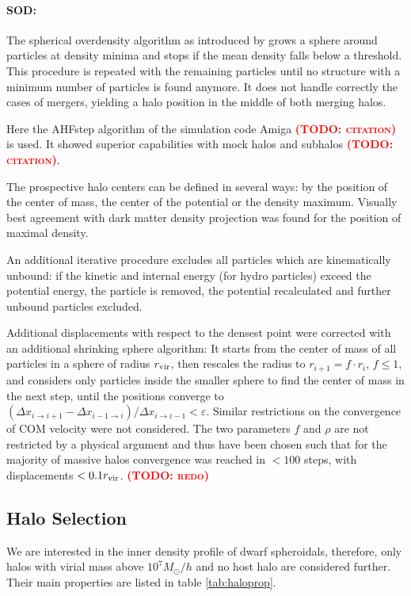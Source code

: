 \documentclass[useAMS,usenatbib]{mn2e}
\newcommand{\TODO}[1]{\textsc{\textbf{\textcolor{red}{(TODO: #1)}}}}
\begin{document}
\paragraph{SOD:}
The spherical overdensity algorithm as introduced by \cite{Lacey1994}
grows a sphere around particles at density minima and stops if the
mean density falls below a threshold. This procedure is repeated with
the remaining particles until no structure with a minimum number of
particles is found anymore. It does not handle correctly the cases of
mergers, yielding a halo position in the middle of both merging halos.

Here the {\sc AHFstep} algorithm of the simulation code {\sc Amiga}
\TODO{citation} is used. It showed superior capabilities with mock
halos and subhalos \TODO{citation}.


The prospective halo centers can be defined in several ways: by the
position of the center of mass, the center of the potential or the
density maximum. Visually best agreement with dark matter density
projection was found for the position of maximal density.

An additional iterative procedure excludes all particles which are
kinematically unbound: if the kinetic and internal energy (for hydro
particles) exceed the potential energy, the particle is removed, the
potential recalculated and further unbound particles excluded.

Additional displacements with respect to the densest point were
corrected with an additional shrinking sphere algorithm: It starts
from the center of mass of all particles in a sphere of radius $r_{\rm
  vir}$, then rescales the radius to $r_{i+1}=f\cdot r_i$, $f\leq
1$, and considers only particles inside the smaller sphere to find the
center of mass in the next step, until the positions converge to
$(\Delta x_{i\to i+1}-\Delta x_{i-1\to i})/\Delta x_{i\to
  i-1}<\varepsilon$. Similar restrictions on the convergence of COM
velocity were not considered. The two parameters $f$ and $\rho$ are
not restricted by a physical argument and thus have been chosen such
that for the majority of massive halos convergence was reached in
$<100$ steps, with displacements $<0.1r_{\rm vir}$. \TODO{redo}

\subsection{Halo Selection}
We are interested in the inner density profile of dwarf spheroidals,
therefore, only halos with virial mass above $10^7M_\odot/h$ and no
host halo are considered further. Their main properties are listed in
table \ref{tab:haloprop}.
\end{document}
